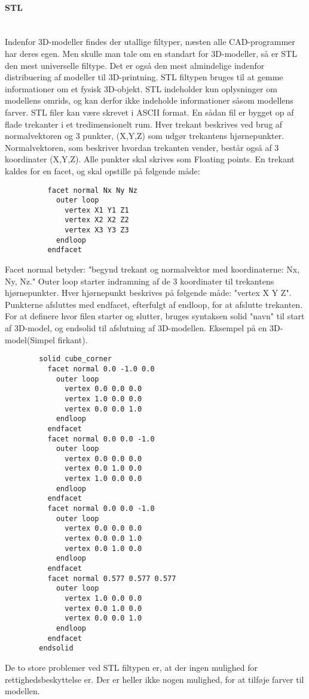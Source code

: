 \paragraph{STL} %
\\
Indenfor 3D-modeller findes der utallige filtyper, næsten alle CAD-programmer har deres egen. Men skulle man tale om en standart for 3D-modeller, så er STL den mest universelle filtype. Det er også den mest almindelige indenfor distribuering af modeller til 3D-printning. \autocite{makerbot}
STL filtypen bruges til at gemme informationer om et fysisk 3D-objekt. STL indeholder kun oplysninger om modellens omrids, og kan derfor ikke indeholde informationer såsom modellens farver. 
STL filer kan være skrevet i ASCII format. 
En sådan fil er bygget op af flade trekanter i et tredimensionelt rum. 
Hver trekant beskrives ved brug af normalvektoren og 3 punkter, (X,Y,Z) som udgør trekantens hjørnepunkter. Normalvektoren, som beskriver hvordan trekanten vender, består også af 3 koordinater (X,Y,Z). Alle punkter skal skrives som Floating points\autocite{stl}.
En trekant kaldes for en facet, og skal opstille på følgende måde:
\begin{lstlisting}
          facet normal Nx Ny Nz
            outer loop
              vertex X1 Y1 Z1
              vertex X2 X2 Z2
              vertex X3 Y3 Z3
            endloop
          endfacet
\end{lstlisting}
\newpage
Facet normal betyder: "begynd trekant og normalvektor med koordinaterne: Nx, Ny, Nz." Outer loop starter indramning af de 3 koordinater til trekantens hjørnepunkter. Hver hjørnepunkt beskrives på følgende måde: "vertex X Y Z". Punkterne afsluttes med endfacet, efterfulgt af endloop, for at afslutte trekanten. 
For at definere hvor filen starter og slutter, bruges syntaksen solid "navn"  til start af 3D-model, og endsolid til afslutning af 3D-modellen.
Eksempel på en 3D-model(Simpel firkant)\autocite{Stl_Eksempel}.
\begin{lstlisting}
        solid cube_corner
          facet normal 0.0 -1.0 0.0
            outer loop
              vertex 0.0 0.0 0.0
              vertex 1.0 0.0 0.0
              vertex 0.0 0.0 1.0
            endloop
          endfacet
          facet normal 0.0 0.0 -1.0
            outer loop
              vertex 0.0 0.0 0.0
              vertex 0.0 1.0 0.0
              vertex 1.0 0.0 0.0
            endloop
          endfacet
          facet normal 0.0 0.0 -1.0
            outer loop
              vertex 0.0 0.0 0.0
              vertex 0.0 0.0 1.0
              vertex 0.0 1.0 0.0
            endloop
          endfacet
          facet normal 0.577 0.577 0.577
            outer loop
              vertex 1.0 0.0 0.0
              vertex 0.0 1.0 0.0
              vertex 0.0 0.0 1.0
            endloop
          endfacet
        endsolid
\end{lstlisting}
De to store problemer ved STL filtypen er, at der ingen mulighed for rettighedsbeskyttelse er. Der er heller ikke nogen mulighed, for at tilføje farver til modellen.